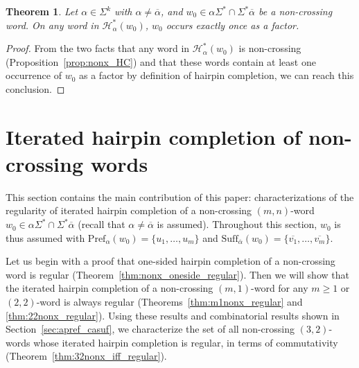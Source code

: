 \documentclass{article}
\theoremstyle{plain}
\newtheorem{theorem}{Theorem}
\theoremstyle{remark}
\newcommand{\HC}{\ensuremath{\mathcal{H}}}
\newcommand{\Pref}{\ensuremath{\mathrm{Pref}}}
\newcommand{\Suff}{\ensuremath{\mathrm{Suff}}}
\newcommand{\calpha}{\ensuremath{\overline{\alpha}}}
\begin{document}
\begin{theorem}\label{thm:nonx_initial_once}
	Let $\alpha \in \Sigma^k$ with $\alpha \neq \overline{\alpha}$, and $w_0 \in \alpha \Sigma^* \cap \Sigma^* \overline{\alpha}$ be a non-crossing word. 
	On any word in $\HC_\alpha^*(w_0)$, $w_0$ occurs exactly once as a factor. 
\end{theorem}
\begin{proof}
	From the two facts that any word in $\HC_\alpha^*(w_0)$ is non-crossing (Proposition~\ref{prop:nonx_HC}) and that these words contain at least one occurrence of $w_0$ as a factor by definition of hairpin completion, we can reach this conclusion. 
\end{proof}


\section{Iterated hairpin completion of non-crossing words}

This section contains the main contribution of this paper: characterizations of the regularity of iterated hairpin completion of a non-crossing $(m, n)$-word $w_0 \in \alpha \Sigma^* \cap \Sigma^* \calpha$ (recall that $\alpha \neq \calpha$ is assumed). 
Throughout this section, $w_0$ is thus assumed with $\Pref_\alpha(w_0) = \{u_1, \ldots, u_m\}$ and $\Suff_{\calpha}(w_0) = \{\overline{v_1}, \ldots, \overline{v_m}\}$. 

Let us begin with a proof that one-sided hairpin completion of a non-crossing word is regular (Theorem~\ref{thm:nonx_oneside_regular}). 
Then we will show that the iterated hairpin completion of a non-crossing $(m, 1)$-word for any $m \ge 1$ or $(2, 2)$-word is always regular (Theorems~\ref{thm:m1nonx_regular} and \ref{thm:22nonx_regular}). 
Using these results and combinatorial results shown in Section~\ref{sec:apref_casuf}, we characterize the set of all non-crossing $(3, 2)$-words whose iterated hairpin completion is regular, in terms of commutativity (Theorem~\ref{thm:32nonx_iff_regular}). 
\end{document}
